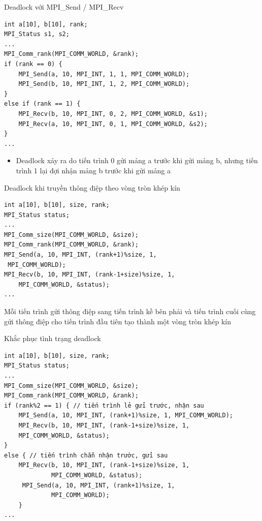 \documentclass[10pt]{beamer}
\theoremstyle{remark}
\numberwithin{algocf}{section}
\numberwithin{equation}{section}
\numberwithin{dl}{section}
\numberwithin{figure}{section}
\begin{document}
\begin{frame}[fragile]{Deadlock với MPI\_Send / MPI\_Recv}
    \begin{verbatim}
int a[10], b[10], rank;
MPI_Status s1, s2;
...
MPI_Comm_rank(MPI_COMM_WORLD, &rank);
if (rank == 0) {
    MPI_Send(a, 10, MPI_INT, 1, 1, MPI_COMM_WORLD);
    MPI_Send(b, 10, MPI_INT, 1, 2, MPI_COMM_WORLD);
}
else if (rank == 1) {
    MPI_Recv(b, 10, MPI_INT, 0, 2, MPI_COMM_WORLD, &s1);
    MPI_Recv(a, 10, MPI_INT, 0, 1, MPI_COMM_WORLD, &s2);
}
...
    \end{verbatim}

    \begin{itemize}
        \item Deadlock xảy ra do tiến trình 0 gửi mảng a trước khi gửi mảng b, nhưng tiến trình 1 lại đợi nhận mảng b trước khi gửi mảng a
    \end{itemize}
\end{frame}

\begin{frame}[fragile]{Deadlock khi truyền thông điệp theo vòng tròn khép kín}
    \begin{verbatim}
int a[10], b[10], size, rank;
MPI_Status status;
...
MPI_Comm_size(MPI_COMM_WORLD, &size);
MPI_Comm_rank(MPI_COMM_WORLD, &rank);
MPI_Send(a, 10, MPI_INT, (rank+1)%size, 1,
 MPI_COMM_WORLD);
MPI_Recv(b, 10, MPI_INT, (rank-1+size)%size, 1,
    MPI_COMM_WORLD, &status);
... 
    \end{verbatim}
    Mỗi tiến trình gửi thông điệp sang tiến trình kề bên phải và tiến trình cuối cùng gửi thông điệp cho tiến trình đầu tiên tạo thành một vòng tròn khép kín
\end{frame}

\begin{frame}[fragile]{Khắc phục tình trạng deadlock}
    \begin{verbatim}
int a[10], b[10], size, rank;
MPI_Status status;
...
MPI_Comm_size(MPI_COMM_WORLD, &size);
MPI_Comm_rank(MPI_COMM_WORLD, &rank);
if (rank%2 == 1) { // tiến trình lẻ gửi trước, nhận sau
    MPI_Send(a, 10, MPI_INT, (rank+1)%size, 1, MPI_COMM_WORLD);
    MPI_Recv(b, 10, MPI_INT, (rank-1+size)%size, 1,
    MPI_COMM_WORLD, &status);
}
else { // tiến trình chẵn nhận trước, gửi sau
    MPI_Recv(b, 10, MPI_INT, (rank-1+size)%size, 1,
             MPI_COMM_WORLD, &status);
     MPI_Send(a, 10, MPI_INT, (rank+1)%size, 1,
             MPI_COMM_WORLD);
    }
...     
    \end{verbatim}
\end{frame}
\end{document}

